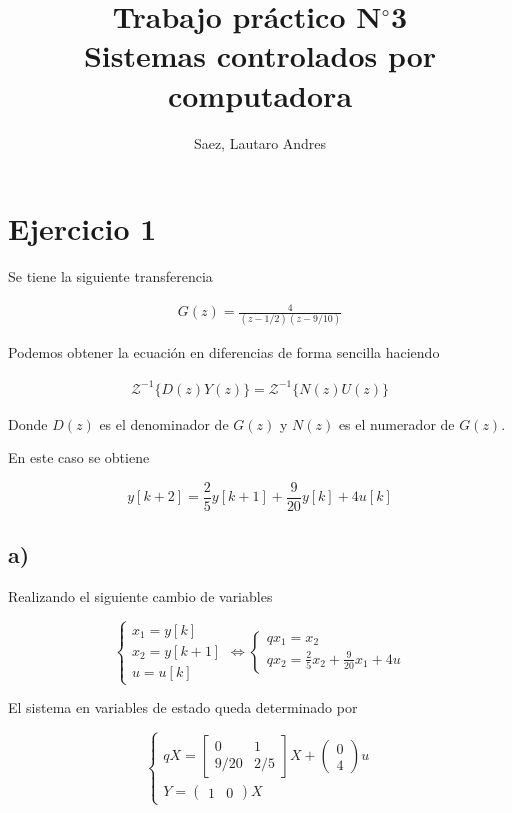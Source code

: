 \documentclass[11pt,a4paper]{article}
\title{Trabajo práctico N$^\circ$3 \\ Sistemas controlados por computadora}
\author{Saez, Lautaro Andres}
\date{}
\newcommand{\antZ}[1]{\mathcal{Z}^{-1}\{ #1 \}}
\newcommand{\siseq}[1]{ \left\{ \begin{array}{c}
    #1
\end{array} \right. }
\begin{document}
    \maketitle

    \section*{Ejercicio 1}

    Se tiene la siguiente transferencia 

    \begin{eqnarray}
        G(z) = \frac{4}{(z-1/2)(z-9/10)}
    \end{eqnarray}

    Podemos obtener la ecuación en diferencias de forma sencilla haciendo 

    \begin{eqnarray}
        \antZ{D(z)Y(z)} = \antZ{N(z)U(z)}
    \end{eqnarray}

    Donde $D(z)$ es el denominador de $G(z)$ y $N(z)$ es el numerador de $G(z)$.

    En este caso se obtiene 

    \begin{equation}
        y[k+2] = \frac{2}{5}y[k+1] + \frac{9}{20}y[k] + 4u[k]
    \end{equation}

    \subsection*{a)}

    Realizando el siguiente cambio de variables 

    \begin{equation}
        \label{eq:1-VE}
        \siseq{ 
            x_1 = y[k] \\ 
            x_2 = y[k+1] \\ 
            u = u[k]
         } \Leftrightarrow 
         \siseq{
             qx_1 = x_2 \\ 
             qx_2 = \frac{2}{5}x_2 + \frac{9}{20}x_1 + 4u
         }
    \end{equation}

    El sistema en variables de estado queda determinado por 

    \begin{equation}
        \siseq{
            qX = 
            \begin{bmatrix}
                0 & 1 \\ 
                9/20 & 2/5 
            \end{bmatrix} X +
            \begin{pmatrix}
                0 \\ 4
            \end{pmatrix} u\\ 
            Y = 
            \begin{pmatrix}
                1 & 0     
            \end{pmatrix} X
        }
    \end{equation}
\end{document}
